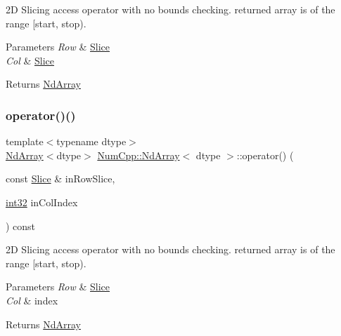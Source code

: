 2D Slicing access operator with no bounds checking. returned array is of the range \mbox{[}start, stop).


\begin{DoxyParams}{Parameters}
{\em Row} & \mbox{\hyperlink{class_num_cpp_1_1_slice}{Slice}} \\
\hline
{\em Col} & \mbox{\hyperlink{class_num_cpp_1_1_slice}{Slice}} \\
\hline
\end{DoxyParams}
\begin{DoxyReturn}{Returns}
\mbox{\hyperlink{class_num_cpp_1_1_nd_array}{Nd\+Array}} 
\end{DoxyReturn}
\mbox{\label{class_num_cpp_1_1_nd_array_ae114ce7c697fa3ef25b4b860eac28cd7}} 
\subsubsection{\texorpdfstring{operator()()}{operator()()}\hspace{0.1cm}{\footnotesize\ttfamily [4/5]}}
{\footnotesize\ttfamily template$<$typename dtype$>$ \\
\mbox{\hyperlink{class_num_cpp_1_1_nd_array}{Nd\+Array}}$<$dtype$>$ \mbox{\hyperlink{class_num_cpp_1_1_nd_array}{Num\+Cpp\+::\+Nd\+Array}}$<$ dtype $>$\+::operator() (\begin{DoxyParamCaption}\item[{const \mbox{\hyperlink{class_num_cpp_1_1_slice}{Slice}} \&}]{in\+Row\+Slice,  }\item[{\mbox{\hyperlink{namespace_num_cpp_acf3eb1592f8b248ff0a236634864633c}{int32}}}]{in\+Col\+Index }\end{DoxyParamCaption}) const\hspace{0.3cm}{\ttfamily [inline]}}

2D Slicing access operator with no bounds checking. returned array is of the range \mbox{[}start, stop).


\begin{DoxyParams}{Parameters}
{\em Row} & \mbox{\hyperlink{class_num_cpp_1_1_slice}{Slice}} \\
\hline
{\em Col} & index \\
\hline
\end{DoxyParams}
\begin{DoxyReturn}{Returns}
\mbox{\hyperlink{class_num_cpp_1_1_nd_array}{Nd\+Array}} 
\end{DoxyReturn}
\mbox{\label{class_num_cpp_1_1_nd_array_a71b49cc783ce50060e3903d8e19fb976}} 
